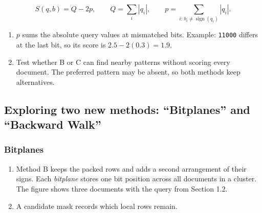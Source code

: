 \begin{equation}
 S(q,b)=Q-2p,\qquad Q=\sum_i|q_i|,\qquad
 p=\sum_{i:\,b_i\ne\operatorname{sign}(q_i)}|q_i|.
 \label{eq:score}
\end{equation}
\begin{enumerate}[start=7]
\item $p$ sums the absolute query values at mismatched bits. Example: \texttt{11000} differs at the last bit, so its score is $2.5-2(0.3)=1.9$.
\item Test whether B or C can find nearby patterns without scoring every document. The preferred pattern may be absent, so both methods keep alternatives.
\end{enumerate}

\newpage
\subsection{Exploring two new methods: ``Bitplanes'' and ``Backward Walk''}
\subsubsection{Bitplanes}
\begin{enumerate}
\item Method B keeps the packed rows and adds a second arrangement of their signs. Each \emph{bitplane} stores one bit position across all documents in a cluster. The figure shows three documents with the query from Section 1.2.
\item A candidate mask records which local rows remain.
\end{enumerate}


